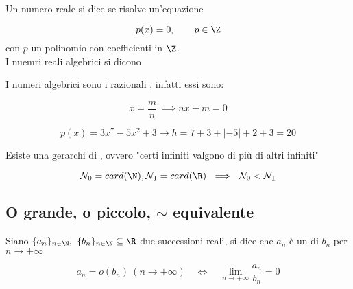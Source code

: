\documentclass[../analisi.tex]{subfiles}
\begin{document}
\begin{defn}
Un numero reale si dice  se risolve un'equazione 

\begin{equation}
	p(x) = 0, \qquad p \in \Z 
\end{equation}
con $p$ un polinomio con coefficienti in $\Z$.\\
I nuemri reali  algebrici si dicono 
\end{defn}

\begin{dimo}
I numeri algebrici sono i razionali , infatti essi sono:


\begin{equation}
	x = \frac{m}{n}\ \implies 
	nx - m = 0
\end{equation}


\begin{equation}
	p(x) = 3x^7 - 5x^2 + 3 \to h = 7 + 3 + | - 5 | + 2 + 3 = 20
\end{equation}

\end{dimo}


\begin{defn}
Esiste una gerarchi di , ovvero "certi infiniti valgono di più di altri
infiniti" 


\begin{equation}
	\mathcal{N}_0 = card(\N), \mathcal{N}_1 = card(\R)\ \implies\
	\mathcal{N}_0 < \mathcal{N}_1
\end{equation}
\end{defn}

\subsection{O grande, o piccolo, $\sim$ equivalente}

\begin{defn}[o piccolo]
Siano $ \{ a_n \}_{n \in \N},\ \{ b_n \}_{n \in \N} \subseteq \R $ due successioni
reali, si dice che $a_n$ è un \tit{"o piccolo"} di $b_n$ per $n \to + \infty$

\begin{equation}
	a_n = o(b_n) \ ( n \to + \infty) \quad \iff \quad
	\lim \limits_{n \to + \infty} \frac{a_n}{b_n} = 0
\end{equation}
\end{defn}
\end{document}
